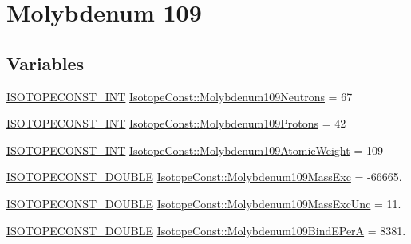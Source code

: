 \hypertarget{group___isotope_const-_molybdenum-_mo109}{}\section{Molybdenum 109}
\label{group___isotope_const-_molybdenum-_mo109}
\subsection*{Variables}
\begin{DoxyCompactItemize}
\item 
\mbox{\hyperlink{group___isotope_const-_macros_ga5f18360b3e99483a35c32d789e62621c}{I\+S\+O\+T\+O\+P\+E\+C\+O\+N\+S\+T\+\_\+\+I\+NT}} \mbox{\hyperlink{group___isotope_const-_molybdenum-_mo109_ga2b9fc1987124eb922b83c1b77d6f5008}{Isotope\+Const\+::\+Molybdenum109\+Neutrons}} = 67
\item 
\mbox{\hyperlink{group___isotope_const-_macros_ga5f18360b3e99483a35c32d789e62621c}{I\+S\+O\+T\+O\+P\+E\+C\+O\+N\+S\+T\+\_\+\+I\+NT}} \mbox{\hyperlink{group___isotope_const-_molybdenum-_mo109_ga9231eac227aa21aba2f38a8f147638e2}{Isotope\+Const\+::\+Molybdenum109\+Protons}} = 42
\item 
\mbox{\hyperlink{group___isotope_const-_macros_ga5f18360b3e99483a35c32d789e62621c}{I\+S\+O\+T\+O\+P\+E\+C\+O\+N\+S\+T\+\_\+\+I\+NT}} \mbox{\hyperlink{group___isotope_const-_molybdenum-_mo109_gac1a2b7d6bf60a1f1dc3ea5fbf47b4ee6}{Isotope\+Const\+::\+Molybdenum109\+Atomic\+Weight}} = 109
\item 
\mbox{\hyperlink{group___isotope_const-_macros_ga8f45a7272ce02c0b4c65c44636ed719a}{I\+S\+O\+T\+O\+P\+E\+C\+O\+N\+S\+T\+\_\+\+D\+O\+U\+B\+LE}} \mbox{\hyperlink{group___isotope_const-_molybdenum-_mo109_gaba4df23cdcc2ac1c0ae2330871210d3c}{Isotope\+Const\+::\+Molybdenum109\+Mass\+Exc}} = -\/66665.
\item 
\mbox{\hyperlink{group___isotope_const-_macros_ga8f45a7272ce02c0b4c65c44636ed719a}{I\+S\+O\+T\+O\+P\+E\+C\+O\+N\+S\+T\+\_\+\+D\+O\+U\+B\+LE}} \mbox{\hyperlink{group___isotope_const-_molybdenum-_mo109_ga8fc653e538adc9ab2b978792da4f80ac}{Isotope\+Const\+::\+Molybdenum109\+Mass\+Exc\+Unc}} = 11.
\item 
\mbox{\hyperlink{group___isotope_const-_macros_ga8f45a7272ce02c0b4c65c44636ed719a}{I\+S\+O\+T\+O\+P\+E\+C\+O\+N\+S\+T\+\_\+\+D\+O\+U\+B\+LE}} \mbox{\hyperlink{group___isotope_const-_molybdenum-_mo109_ga0c90d949bb98985290761cc0a9aafd56}{Isotope\+Const\+::\+Molybdenum109\+Bind\+E\+PerA}} = 8381.

\end{DoxyCompactItemize}
